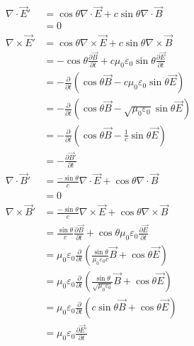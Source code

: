 \documentclass{phyasgn}
\begin{document}
\begin{sol}[4]
  \begin{align*}
    \nabla\cdot\vec{E}'&=\cos\theta\nabla\cdot\vec{E}+c\sin\theta\nabla\cdot\vec{B}\\
    &=0\\
    \nabla\times\vec{E}'&=\cos\theta\nabla\times\vec{E}+c\sin\theta\nabla\times\vec{B}\\
    &=-\cos\theta\frac{\partial \vec{B}}{\partial t}+c\mu_0\varepsilon_0\sin\theta\frac{\partial\vec{E}}{\partial t}\\
    &=-\frac{\partial}{\partial t}(\cos\theta\vec{B}-c\mu_0\varepsilon_0\sin\theta\vec{E})\\
    &=-\frac{\partial}{\partial t}(\cos\theta\vec{B}-\sqrt{\mu_0\varepsilon_0}\sin\theta\vec{E})\\
    &=-\frac{\partial}{\partial t}(\cos\theta\vec{B}-\frac{1}{c}\sin\theta\vec{E})\\
    &=-\frac{\partial \vec{B}'}{\partial t}\\
    \nabla\cdot\vec{B}'&=\frac{-\sin\theta}{c}\nabla\cdot\vec{E}+\cos\theta\nabla\cdot\vec{B}\\
    &=0\\
    \nabla\times\vec{B}'&=\frac{-\sin\theta}{c}\nabla\times\vec{E}+\cos\theta\nabla\times\vec{B}\\
    &=\frac{\sin\theta}{c}\frac{\partial\vec{B}}{\partial t}+\cos\theta\mu_0\varepsilon_0\frac{\partial \vec{E}}{\partial t}\\
    &=\mu_0\varepsilon_0\frac{\partial}{\partial t}(\frac{\sin\theta}{\mu_0\varepsilon_0c}\vec{B}+\cos\theta\vec{E})\\
    &=\mu_0\varepsilon_0\frac{\partial}{\partial t}(\frac{\sin\theta}{\sqrt{\mu_0\varepsilon_0}}\vec{B}+\cos\theta\vec{E})\\
    &=\mu_0\varepsilon_0\frac{\partial}{\partial t}(c\sin\theta\vec{B}+\cos\theta\vec{E})\\
    &=\mu_0\varepsilon_0\frac{\partial \vec{E}'}{\partial t}
  \end{align*}
\end{sol}\par
\end{document}
